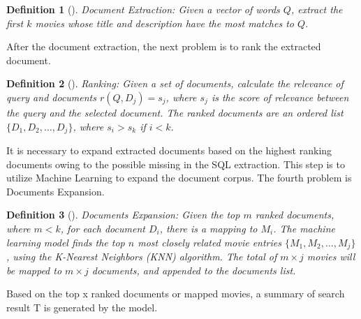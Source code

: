 \documentclass[journal]{IEEEtran}
\theoremstyle{mydefstyle}
\newtheorem{definition}{Definition}[section]
\begin{document}
\begin{adjustwidth}{0.75cm}{} \begin{definition}[]
\textit{Document Extraction:} Given a vector of words \( Q \), extract the first \( k \) movies whose title and description have the most matches to \( Q \).
\end{definition} \end{adjustwidth}

\vspace{10pt} 

After the document extraction, the next problem is to rank the extracted document. 

\begin{adjustwidth}{0.75cm}{} \begin{definition}[]
\textit{Ranking:} Given a set of documents, calculate the relevance of query and documents \( r(Q, D_j) = s_j \), where \( s_j \) is the score of relevance between the query and the selected document. The ranked documents are an ordered list \( \{D_1, D_2, \ldots, D_j\} \), where \( s_i > s_k \) if \( i < k \).

\end{definition} \end{adjustwidth}

\vspace{10pt} 

It is necessary to expand extracted documents based on the highest ranking documents owing to the possible missing in the SQL extraction. This step is to utilize Machine Learning to expand the document corpus. The fourth problem is Documents Expansion.

\begin{adjustwidth}{0.75cm}{} \begin{definition}[]
\textit{Documents Expansion:} Given the top \( m \) ranked documents, where \( m < k \), for each document \( D_i \), there is a mapping to \( M_i \). The machine learning model finds the top \( n \) most closely related movie entries \( \{M_1, M_2, \ldots, M_j\} \), using the K-Nearest Neighbors (KNN) algorithm. The total of \( m \times j \) movies will be mapped to \( m \times j \) documents, and appended to the documents list.
\end{definition} \end{adjustwidth}

\vspace{10pt} 

Based on the top x ranked documents or mapped movies, a summary of search result T is generated by the model. 
\end{document}
